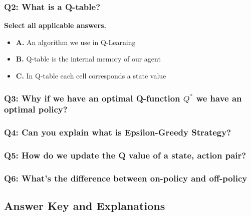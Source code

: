 \documentclass[11pt,a4paper]{article}
\begin{document}
\subsubsection{Q2: What is a Q-table?}\label{q2-what-is-a-q-table}

\textbf{Select all applicable answers.}

\begin{itemize}
\tightlist
\item
  \textbf{A.} An algorithm we use in Q-Learning
\item
  \textbf{B.} Q-table is the internal memory of our agent
\item
  \textbf{C.} In Q-table each cell corresponds a state value
\end{itemize}

\subsubsection{\texorpdfstring{Q3: Why if we have an optimal Q-function \(Q^*\) we have an optimal policy?}{Q3: Why if we have an optimal Q-function Q\^{}* we have an optimal policy?}}\label{q3-why-if-we-have-an-optimal-q-function-q-we-have-an-optimal-policy}

\subsubsection{Q4: Can you explain what is Epsilon-Greedy Strategy?}\label{q4-can-you-explain-what-is-epsilon-greedy-strategy}

\subsubsection{Q5: How do we update the Q value of a state, action pair?}\label{q5-how-do-we-update-the-q-value-of-a-state-action-pair}


\subsubsection{Q6: What's the difference between on-policy and off-policy}\label{q6-whats-the-difference-between-on-policy-and-off-policy}

\subsection{Answer Key and Explanations}\label{answer-key-and-explanations-1}
\end{document}
